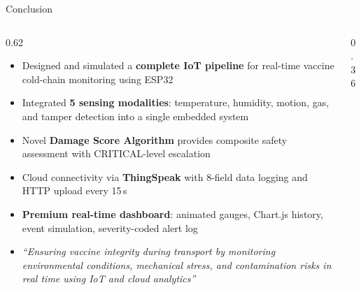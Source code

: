 \documentclass[aspectratio=169, 10pt]{beamer}
\begin{document}
\begin{frame}[shrink=5]{Conclusion}
  \begin{columns}[T]
    \begin{column}{0.62\textwidth}
      \begin{itemize}\setlength\itemsep{0.38em}
        \item Designed and simulated a \textbf{complete IoT pipeline} for real-time vaccine cold-chain monitoring using ESP32
        \item Integrated \textbf{5 sensing modalities}: temperature, humidity, motion, gas, and tamper detection into a single embedded system
        \item Novel \textbf{Damage Score Algorithm} provides composite safety assessment with CRITICAL-level escalation
        \item Cloud connectivity via \textbf{ThingSpeak} with 8-field data logging and HTTP upload every 15\,s
        \item \textbf{Premium real-time dashboard}: animated gauges, Chart.js history, event simulation, severity-coded alert log
        \item \textit{``Ensuring vaccine integrity during transport by monitoring environmental conditions, mechanical stress, and contamination risks in real time using IoT and cloud analytics''}
      \end{itemize}
    \end{column}
    \begin{column}{0.36\textwidth}
      \begin{center}
      \vspace{0.2em}
      \vspace{0.4em}


\end{center}
\end{column}
\end{columns}
\end{frame}
\end{document}
